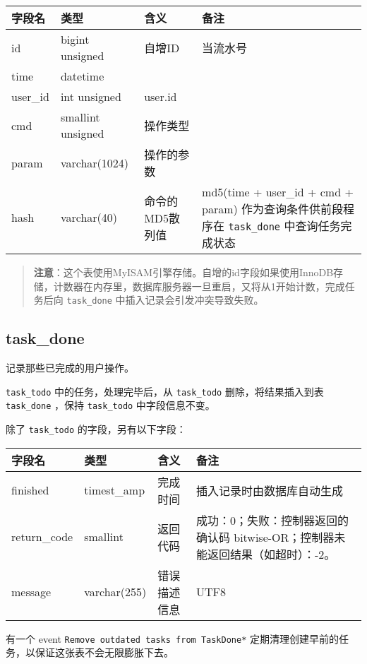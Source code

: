 \begin{longtabu}[c]{@{}lXXX@{}}
\toprule
字段名 & 类型 & 含义 & 备注\tabularnewline
\midrule
\endhead
id & bigint unsigned & 自增ID & 当流水号\tabularnewline
time & datetime & &\tabularnewline
user\_id & int unsigned & user.id &\tabularnewline
cmd & smallint unsigned & 操作类型 &\tabularnewline
param & varchar(1024) & 操作的参数 &\tabularnewline
hash & varchar(40) & 命令的MD5散列值 & md5(time + user\_id + cmd +
param) 作为查询条件供前段程序在 \texttt{task\_done}
中查询任务完成状态\tabularnewline
\bottomrule
\end{longtabu}

\begin{quote}
\textbf{注意}：这个表使用MyISAM引擎存储。自增的id字段如果使用InnoDB存储，计数器在内存里，数据库服务器一旦重启，又将从1开始计数，完成任务后向
\texttt{task\_done} 中插入记录会引发冲突导致失败。
\end{quote}

\subsection{task\_done}\label{taskux5fdone}

记录那些已完成的用户操作。

\texttt{task\_todo} 中的任务，处理完毕后，从 \texttt{task\_todo}
删除，将结果插入到表 \texttt{task\_done} ，保持 \texttt{task\_todo}
中字段信息不变。

除了 \texttt{task\_todo} 的字段，另有以下字段：

\begin{longtabu}[c]{@{}lXXX@{}}
\toprule
字段名 & 类型 & 含义 & 备注\tabularnewline
\midrule
\endhead
finished & timest\_amp & 完成时间 &
插入记录时由数据库自动生成\tabularnewline
return\_code & smallint & 返回代码 & 成功：0；失败：控制器返回的确认码
bitwise-OR；控制器未能返回结果（如超时）：-2。\tabularnewline
message & varchar(255) & 错误描述信息 & UTF8\tabularnewline
\bottomrule
\end{longtabu}

有一个 event \texttt{Remove outdated tasks from TaskDone*}
定期清理创建早前的任务，以保证这张表不会无限膨胀下去。
